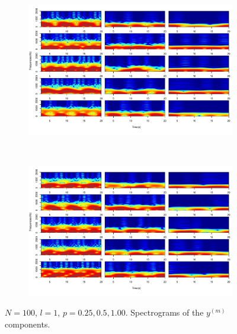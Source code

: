 \documentclass[11pt, a4paper]{article} %
\begin{document}
\begin{figure}
\begin{subfigure}{1.1\textwidth}
  \centering
  \includegraphics[width=\linewidth]{spectro_N100_l1_y_m_1_5.pdf}
  \label{fig:sfig1}
\end{subfigure}\\
\begin{subfigure}{1.1\textwidth}
  \centering
  \includegraphics[width=\linewidth]{spectro_N100_l1_y_m_6_10.pdf}
  \label{fig:sfig2}
\end{subfigure}
\label{fig1}
\caption{$N = 100$, $l = 1$, $p = 0.25, 0.5, 1.00$. Spectrograms of the $y^{(m)}$ components.}
\end{figure}

\restoregeometry


\end{document}
